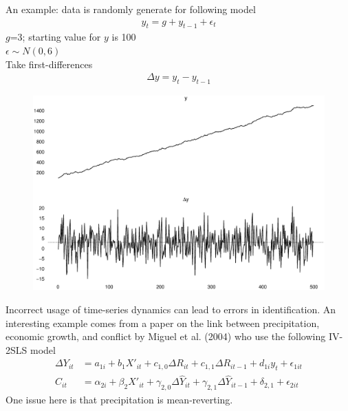\documentclass{beamer}
\begin{document}
\begin{frame}
  An example: data is randomly generate for following model
  \begin{align}
    y_t=g+y_{t-1}+\epsilon_t
  \end{align}
  \medskip
  $g$=3; starting value for $y$ is 100\\
  $\epsilon \sim N(0,6)$\\
  Take first-differences
  \begin{align}
    \Delta y = y_t - y_{t-1}
  \end{align}
\end{frame}

\begin{frame}
  \begin{figure}
    \includegraphics[scale=.3]{detrending_issue.eps}
  \end{figure}
\end{frame}

\begin{frame}
  Incorrect usage of time-series dynamics can lead to errors in identification. 
  An interesting example comes from a paper on the link between precipitation, economic growth, and conflict by Miguel et al. (2004) who use the following IV-2SLS model
  \begin{align}
    \Delta Y_{it} &= a_{1i} + b_1X'_{it} + c_{1,0}\Delta R_{it} + c_{1,1} \Delta R_{it-1} + d_{1i}y_t +\epsilon_{1it}\\
    C_{it} &= \alpha_{2i} + \beta_2 X'_{it} + \gamma_{2,0} \Delta \hat{Y}_{it} + \gamma_{2,1} \Delta \hat{Y}_{it-1} + \delta_{2,1} + \epsilon_{2it}
  \end{align}
  \medskip
  One issue here is that precipitation is mean-reverting.
\end{frame}
\end{document}
